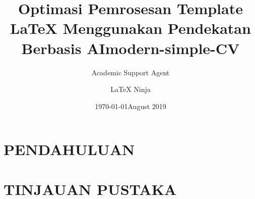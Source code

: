 \documentclass{modernsimplecv}
\title{Optimasi Pemrosesan Template LaTeX Menggunakan Pendekatan Berbasis AI}
\author{Academic Support Agent}
\date{\today}
\begin{document}
\maketitle

\begin{abstract}

\end{abstract}

\chapter{PENDAHULUAN}


\chapter{TINJAUAN PUSTAKA}


\usepackage[utf8]{inputenc}
\usepackage[margin=1cm, a4paper]{geometry}

\usepackage[default]{raleway}


\usepackage{beuron}
\usepackage{LobsterTwo}%




\newlength{\rightcolwidth}
\newlength{\leftcolwidth}
\setlength{\leftcolwidth}{0.48\textwidth}
\setlength{\rightcolwidth}{0.47\textwidth}

\title{modern-simple-CV}
\author{\LaTeX{} Ninja}
\date{August 2019}
\end{document}
